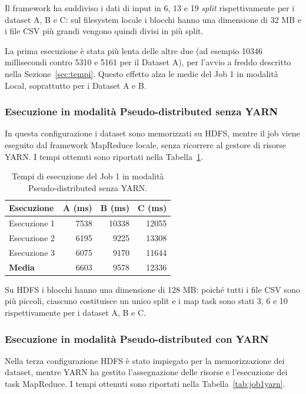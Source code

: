 \documentclass[12pt, a4paper]{article}
\begin{document}
Il framework ha suddiviso i dati di input
in 6, 13 e 19 \textit{split} rispettivamente
per i dataset A, B e C: sul filesystem locale
i blocchi hanno una dimensione di 32 MB e i file
CSV più grandi vengono quindi divisi in più split.

La prima esecuzione è stata più lenta delle altre due
(ad esempio 10346 millisecondi contro 5310 e 5161
per il Dataset A), per l'avvio a freddo descritto
nella Sezione~\ref{sec:tempi}. Questo effetto alza
le medie del Job 1 in modalità Local, soprattutto
per i Dataset A e B.

\subsubsection{Esecuzione in modalità
Pseudo-distributed senza YARN}

In questa configurazione i dataset sono memorizzati
su HDFS, mentre il job viene eseguito dal framework
MapReduce locale, senza ricorrere al gestore di risorse YARN.
I tempi ottenuti sono riportati nella
Tabella~\ref{tab:job1pd}.

\begin{table}[H]
\centering
\small
\begin{tabular}{|l|r|r|r|}
\hline
\textbf{Esecuzione} &
\textbf{A (ms)} &
\textbf{B (ms)} &
\textbf{C (ms)} \\
\hline
Esecuzione 1 & 7538 & 10338 & 12055 \\
Esecuzione 2 & 6195 & 9225 & 13308 \\
Esecuzione 3 & 6075 & 9170 & 11644 \\
\hline
\textbf{Media} & 6603 & 9578 & 12336 \\
\hline
\end{tabular}
\caption{Tempi di esecuzione del Job 1 in modalità Pseudo-distributed senza YARN.}
\label{tab:job1pd}
\end{table}

Su HDFS i blocchi hanno una dimensione di 128 MB:
poiché tutti i file CSV sono più piccoli, ciascuno
costituisce un unico split e i map task sono stati
3, 6 e 10 rispettivamente per i dataset A, B e C.

\subsubsection{Esecuzione in modalità
Pseudo-distributed con YARN}

Nella terza configurazione HDFS è stato impiegato
per la memorizzazione dei dataset, mentre YARN
ha gestito l'assegnazione delle risorse
e l'esecuzione dei task MapReduce.
I tempi ottenuti sono riportati nella
Tabella~\ref{tab:job1yarn}.
\end{document}
